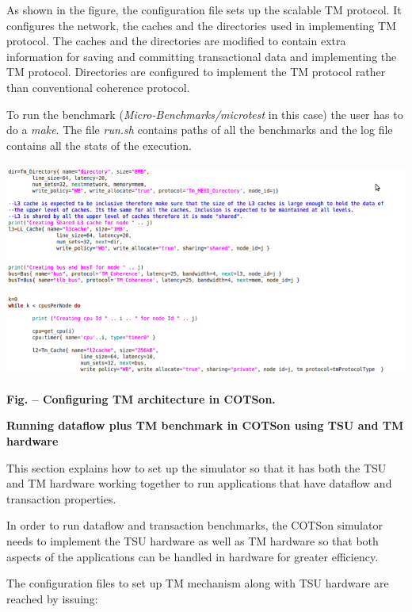 \documentclass[a4paper]{article}
\newcounter{Figure}
\renewcommand\theFigure{\arabic{Figure}}
\begin{document}
{
As shown in the figure, the configuration file sets up the scalable TM
protocol. It configures the network, the caches and the directories
used in implementing TM protocol. The caches and the directories are
modified to contain extra information for saving and committing
transactional data and implementing the TM protocol. Directories are
configured to implement the TM protocol rather than conventional
coherence protocol.}

{
To run the benchmark (\textit{Micro-Benchmarks/microtest} in this case)
the user has to do a \textit{make}. The file \textit{run.sh} contains
paths of all the benchmarks and the log file contains all the stats of
the execution.}

{\centering 
\includegraphics[width=5.4709in,height=2.7898in]{img53.png}
\par}

{\centering{}\sffamily\bfseries
\label{bkm:Ref388170914}Fig.
\stepcounter{Figure}{\theFigure} -- Configuring TM architecture in
COTSon.
\par}

{
\textbf{Running dataflow plus TM benchmark in COTSon using TSU and TM
hardware}}

{
This section explains how to set up the simulator so that it has both
the TSU and TM hardware working together to run applications that have
dataflow and transaction properties.}

{
In order to run dataflow and transaction benchmarks, the COTSon
simulator needs to implement the TSU hardware as well as TM hardware so
that both aspects of the applications can be handled in hardware for
greater efficiency.}

{
The configuration files to set up TM mechanism along with TSU hardware
are reached by issuing:}
\end{document}
